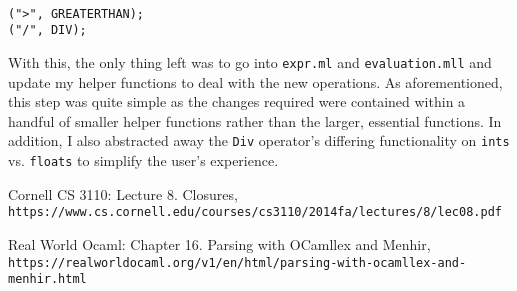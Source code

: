 \documentclass{report}
\begin{document}
\begin{verbatim}

(">", GREATERTHAN);
("/", DIV);

\end{verbatim}
\newline \newline
With this, the only thing left was to go into \texttt{expr.ml} and \texttt{evaluation.mll} and update my helper functions to deal with the new operations. As aforementioned, this step was quite simple as the changes required were contained within a handful of smaller helper functions rather than the larger, essential functions. In addition, I also abstracted away the \texttt{Div} operator's differing functionality on \texttt{ints} vs. \texttt{floats} to simplify the user's experience.

\begin{thebibliography}{9}

Cornell CS 3110: Lecture 8. Closures,
\\\texttt{https://www.cs.cornell.edu/courses/cs3110/2014fa/lectures/8/lec08.pdf}

Real World Ocaml: Chapter 16. Parsing with OCamllex and Menhir,
\\\texttt{https://realworldocaml.org/v1/en/html/parsing-with-ocamllex-and-menhir.html}

\end{thebibliography}
\end{document}
